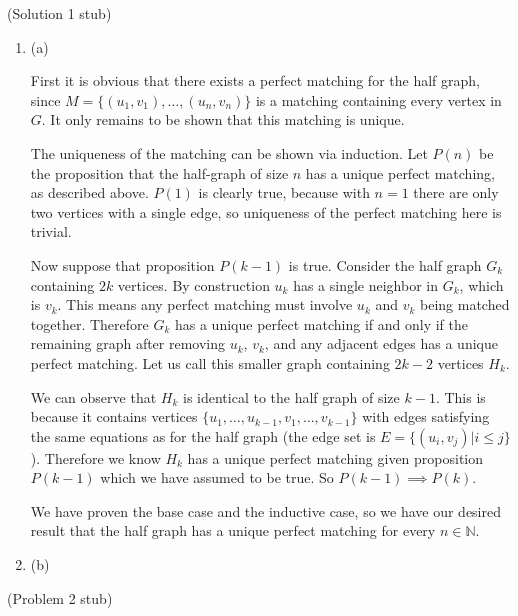\documentclass{hmcpset}
\begin{document}
\begin{solution}
(Solution 1 stub)
\begin{enumerate}
\item (a)

First it is obvious that there exists a perfect matching for the half graph, since
$M = \{(u_1,v_1),\ldots,(u_n,v_n)\}$ is a matching containing every vertex in $G$.
It only remains to be shown that this matching is unique.

The uniqueness of the matching can be shown via induction. Let $P(n)$ be the
proposition that the half-graph of size $n$ has a unique perfect matching,
as described above. $P(1)$ is clearly true, because with $n = 1$ there are only
two vertices with a single edge, so uniqueness of the perfect matching here
is trivial.

Now suppose that proposition $P(k - 1)$ is true. Consider the half graph $G_k$
containing $2k$ vertices. By construction $u_k$ has a single neighbor in $G_k$,
which is $v_k$. This means any perfect matching must involve $u_k$ and $v_k$
being matched together. Therefore $G_k$ has a unique perfect matching if and
only if the remaining graph after removing $u_k$, $v_k$, and any adjacent edges
has a unique perfect matching. Let us call this smaller graph containing
$2k -2$ vertices $H_k$.

We can observe that $H_k$ is identical to the half graph of size $k - 1$. This
is because it contains vertices $\{u_1,\ldots,u_{k-1},v_1,\ldots,v_{k-1}\}$ with
edges satisfying the same equations as for the half graph (the edge set is
$E = \{(u_i, v_j) | i \leq j\}$). Therefore we know $H_k$ has a unique perfect
matching given proposition $P(k - 1)$ which we have assumed to be true.
So $P(k - 1) \implies P(k)$.

We have proven the base case and the inductive case, so we have our desired
result that the half graph has a unique perfect matching for every $n \in \mathbb{N}$.


\item (b)
\end{enumerate}
\end{solution}
\begin{problem}[2]
(Problem 2 stub)
\end{problem}
\end{document}
